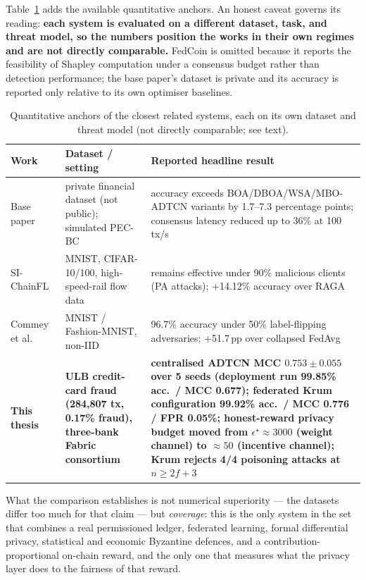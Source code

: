 Table~\ref{tab:prior_quant} adds the available quantitative anchors. An honest caveat governs its reading: \textbf{each system is evaluated on a different dataset, task, and threat model, so the numbers position the works in their own regimes and are not directly comparable.} FedCoin is omitted because it reports the feasibility of Shapley computation under a consensus budget rather than detection performance; the base paper's dataset is private and its accuracy is reported only relative to its own optimiser baselines.

\begin{table}[H]
\centering
\caption{Quantitative anchors of the closest related systems, each on its own dataset and threat model (not directly comparable; see text).}
\label{tab:prior_quant}
\small\setlength{\tabcolsep}{4pt}
\begin{tabular}{p{3.2cm}p{4.2cm}p{6.6cm}}
\toprule
\textbf{Work} & \textbf{Dataset / setting} & \textbf{Reported headline result} \\
\midrule
Base paper~\cite{prabanand2025} & private financial dataset (not public); simulated PEC-BC & accuracy exceeds BOA/DBOA/WSA/MBO-ADTCN variants by 1.7--7.3 percentage points; consensus latency reduced up to 36\% at 100\,tx/s \\
\midrule
SI-ChainFL~\cite{zhao2026sichainfl} & MNIST, CIFAR-10/100, high-speed-rail flow data & remains effective under 90\% malicious clients (PA attacks); +14.12\% accuracy over RAGA \\
\midrule
Commey et al.~\cite{commey2025} & MNIST / Fashion-MNIST, non-IID & 96.7\% accuracy under 50\% label-flipping adversaries; +51.7\,pp over collapsed FedAvg \\
\midrule
\textbf{This thesis} & \textbf{ULB credit-card fraud (284{,}807 tx, 0.17\% fraud), three-bank Fabric consortium} & \textbf{centralised ADTCN MCC $0.753 \pm 0.055$ over 5 seeds (deployment run 99.85\% acc.\ / MCC 0.677); federated Krum configuration 99.92\% acc.\ / MCC 0.776 / FPR 0.05\%; honest-reward privacy budget moved from $\epsilon^{\star}\approx 3000$ (weight channel) to $\approx 50$ (incentive channel); Krum rejects 4/4 poisoning attacks at $n\ge 2f+3$} \\
\bottomrule
\end{tabular}
\end{table}

What the comparison establishes is not numerical superiority --- the datasets differ too much for that claim --- but \emph{coverage}: this is the only system in the set that combines a real permissioned ledger, federated learning, formal differential privacy, statistical and economic Byzantine defences, and a contribution-proportional on-chain reward, and the only one that measures what the privacy layer does to the fairness of that reward.

